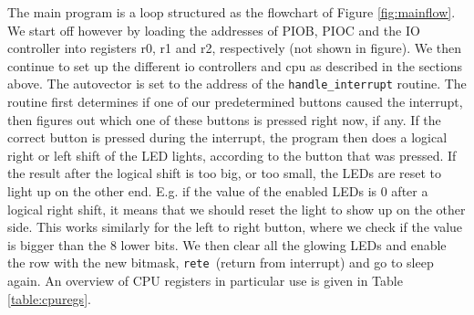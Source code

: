 The main program is a loop structured as the flowchart of Figure \ref{fig:mainflow}. We start off however by loading the addresses of PIOB, PIOC and the IO controller into registers r0, r1 and r2, respectively (not shown in figure). We then continue to set up the different io controllers and cpu as described in the sections above. The autovector is set to the address of the \texttt{handle\_interrupt} routine. The routine first determines if one of our predetermined buttons caused the interrupt, then figures out which one of these buttons is pressed right now, if any. If the correct button is pressed during the interrupt, the program then does a logical right or left shift of the LED lights, according to the button that was pressed. If the result after the logical shift is too big, or too small, the LEDs are reset to light up on the other end. E.g. if the value of the enabled LEDs is 0 after a logical right shift, it means that we should reset the light to show up on the other side. This works similarly for the left to right button, where we check if the value is bigger than the 8 lower bits. We then clear all the glowing LEDs and enable the row with the new bitmask, \texttt{rete} (return from interrupt) and go to sleep again. An overview of CPU registers in particular use is given in Table \ref{table:cpuregs}.


